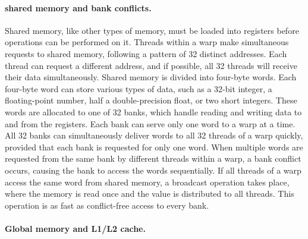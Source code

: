 \paragraph{shared memory and bank conflicts.}
Shared memory, like other types of memory, must be loaded into registers before operations can be performed on it.
%
Threads within a warp make simultaneous requests to shared memory, following a pattern of 32 distinct addresses.
%
Each thread can request a different address, and if possible, all 32 threads will receive their data simultaneously.
%
Shared memory is divided into four-byte words.
%
Each four-byte word can store various types of data, such as a 32-bit integer, a floating-point number, half a double-precision float, or two short integers.
%
These words are allocated to one of 32 banks, which handle reading and writing data to and from the registers.
%
Each bank can serve only one word to a warp at a time.
All 32 banks can simultaneously deliver words to all 32 threads of a warp quickly, provided that each bank is requested for only one word.
%
When multiple words are requested from the same bank by different threads within a warp, a bank conflict occurs, causing the bank to access the words sequentially.
%
If all threads of a warp access the same word from shared memory, a broadcast operation takes place, where the memory is read once and the value is distributed to all threads. 
%
This operation is as fast as conflict-free access to every bank.

\paragraph{Global memory and L1/L2 cache.}


